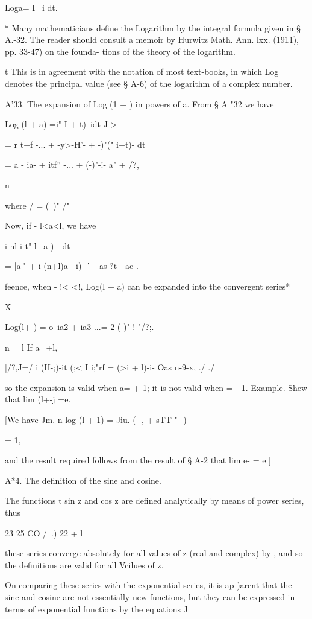 Loga= I ~i dt.

* Many mathematicians define the Logarithm by the integral formula
given in § A.-32. The reader should consult a memoir by Hurwitz Math.
Ann. lxx. (1911), pp. 33-47) on the founda- tions of the theory of the
logarithm.

t This is in agreement with the notation of most text-books, in which
Log denotes the principal value (see § A-6) of the logarithm of a
complex number.

%
%

A'33. The expansion of Log (1 + ) in powers of a. From § A "32 we have

Log (l + a) =i" I + t)~idt J >

= r t+f -... + -y>-H'- + -)"(" i+t)- dt

= a - ia- + itf'' -... + (-)"-!- a" + /?,

n

where / = (\ )" /"%

Now, if - l<a<l, we have

i nl i t" l-\ a ) - dt

= |a|" + i (n+l)a-| i) -' -- as ?t - ac .

feence, when - !< <!, Log(l + a) can be expanded into the convergent
series*

X

Log(l+ ) = o--ia2 + ia3-...= 2 (-)"-! "/?;.

n = l If a=+l,

|/?,J=/ i (H-;)-it (;< I i;"rf = (>i + l)-i- Oas n-9-x, ./ ./

so the expansion is valid when a= + 1; it is not valid when = - 1.
Example. Shew that lim (l+-j =e.

[We have Jm. n log (l + 1) = Jiu. ( -, + sTT " -)

= 1,

and the result required follows from the result of § A-2 that lim e- =
e ]

A*4. The definition of the sine and cosine.

The functions t sin z and cos z are defined analytically by means of
power series, thus

23 25 CO /\ .) 22 + l

these series converge absolutely for all values of z (real and
complex) by , and so the definitions are valid for all Vcilues
of z.

On comparing these series with the exponential scries, it is ap )arcnt
that the sine and cosine are not essentially new functions, but they
can be expressed in terms of exponential functions by the equations J

